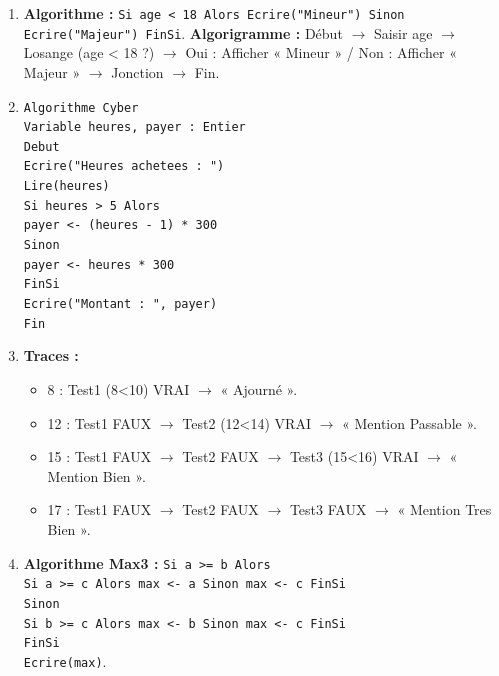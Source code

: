\documentclass[11pt]{article}
\begin{document}
\begin{corrige}
\begin{enumerate}
\item \textbf{Algorithme :} \texttt{Si age < 18 Alors Ecrire("Mineur") Sinon Ecrire("Majeur") FinSi}. \textbf{Algorigramme :} Début $\rightarrow$ Saisir age $\rightarrow$ Losange (age < 18 ?) $\rightarrow$ Oui : Afficher « Mineur » / Non : Afficher « Majeur » $\rightarrow$ Jonction $\rightarrow$ Fin.
\item \texttt{Algorithme Cyber\\ Variable heures, payer : Entier\\ Debut\\ \quad Ecrire("Heures achetees : ")\\ \quad Lire(heures)\\ \quad Si heures > 5 Alors\\ \quad \quad payer <- (heures - 1) * 300\\ \quad Sinon\\ \quad \quad payer <- heures * 300\\ \quad FinSi\\ \quad Ecrire("Montant : ", payer)\\ Fin}
\item \textbf{Traces :}
\begin{itemize}
\item 8 : Test1 (8<10) VRAI $\rightarrow$ « Ajourné ».
\item 12 : Test1 FAUX $\rightarrow$ Test2 (12<14) VRAI $\rightarrow$ « Mention Passable ».
\item 15 : Test1 FAUX $\rightarrow$ Test2 FAUX $\rightarrow$ Test3 (15<16) VRAI $\rightarrow$ « Mention Bien ».
\item 17 : Test1 FAUX $\rightarrow$ Test2 FAUX $\rightarrow$ Test3 FAUX $\rightarrow$ « Mention Tres Bien ».
\end{itemize}
\item \textbf{Algorithme Max3 :} \texttt{Si a >= b Alors\\ \quad Si a >= c Alors max <- a Sinon max <- c FinSi\\ Sinon\\ \quad Si b >= c Alors max <- b Sinon max <- c FinSi\\ FinSi\\ Ecrire(max)}.
\end{enumerate}
\end{corrige}
\end{document}
